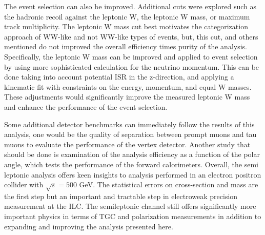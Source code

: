 The event selection can also be improved. Additional cuts were explored such as the hadronic recoil against the leptonic W, the leptonic W mass, or maximum track multiplicity. The leptonic W mass cut best motivates the categorization approach of WW-like and not WW-like types of events, but, this cut, and others mentioned do not improved the overall efficiency times purity of the analysis.  Specifically, the leptonic W mass can be improved and applied to event selection by using more sophisticated calculation for the neutrino momentum. This can be done taking into account potential ISR in the z-direction, and applying a kinematic fit with constraints on the energy, momentum, and equal W masses. These adjustments would significantly improve the measured leptonic W mass and enhance the performance of the event selection. 
 
Some additional detector benchmarks can immediately follow the results of this analysis, one would be the quality of separation between prompt muons and tau muons to evaluate the performance of the vertex detector. Another study that should be done is examination of the analysis efficiency as a function of the polar angle, which tests the performance of the forward calorimeters.  Overall, the semi leptonic analysis offers keen insights to analysis performed in an electron positron collider with $\sqrt{s} = 500$ GeV. The statistical errors on cross-section and mass are the first step but an important and tractable step in electroweak precision measurement at the ILC.  The semileptonic channel still offers significantly more important physics in terms of TGC and polarization measurements in addition to expanding and improving the analysis presented here. 